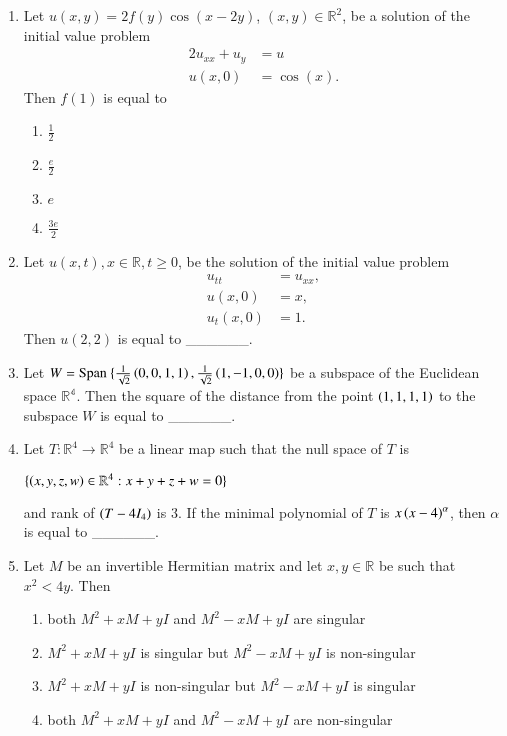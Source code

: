 \documentclass[journal,12pt,onecolumn]{IEEEtran}
\theoremstyle{remark}
\begin{document}
\begin{enumerate}
\item Let $u(x, y) = 2f(y) \cos(x - 2y)$, $(x, y) \in \mathbb{R}^2$, be a solution of the initial value problem
\begin{align*}
	2u_{xx} + u_y &= u \\
	u(x, 0) &= \cos(x).
\end{align*}
Then $f(1)$ is equal to
\begin{multicols}{4}
	\begin{enumerate}
		\item $\frac{1}{2}$
		\item $\frac{e}{2}$
		\item $e$
		\item $\frac{3e}{2}$
	\end{enumerate}
\end{multicols}
\item Let $u(x,t), x\in \mathbb{R}, t\geq0$, be the solution of the initial value problem
\begin{align*}
	u_{tt} &= u_{xx}, \\
	u(x,0) &= x, \\
	u_t(x,0) &= 1.
\end{align*}
Then $u(2,2)$ is equal to \_\_\_\_\_\_.\\

\item Let $W = \text{Span } \{\frac{1}{\sqrt{2}}\left(0,0,1,1\right), \frac{1}{\sqrt{2}}\left(1,-1,0,0\right) \}$ be a subspace of the Euclidean space $\mathbb{R^{4}}$. Then the square of the distance from the point $\left(1,1,1,1\right)$ to the subspace $W$ is equal to \_\_\_\_\_\_.\\

\item Let $T : \mathbb{R}^{4} \rightarrow \mathbb{R}^{4}$ be a linear map such that the null space of $T$ is
\begin{center}
	$\{ \left(x,y,z,w\right) \in \mathbb{R}^{4}:x+y+z+w=0 \}$
\end{center}
and rank of $\left(T - 4I_4\right)$ is $3$. If the minimal polynomial of $T$ is $x\left(x-4\right)^{\alpha}$, then $\alpha$ is equal to \_\_\_\_\_\_.\\

\item Let $M$ be an invertible Hermitian matrix and let $x,y \in \mathbb{R}$ be such that $x^{2}<4y$. Then
\begin{enumerate}
	\item both $M^{2} + xM + yI$ and $M^{2} - xM + yI$ are singular
	\item $M^{2} + xM + yI$ is singular but $M^{2} - xM + yI$ is non-singular
	\item $M^{2} + xM + yI$ is non-singular but $M^{2} - xM + yI$ is singular
	\item both $M^{2} + xM + yI$ and $M^{2} - xM + yI$ are non-singular
\end{enumerate}


\end{enumerate}
\end{document}
